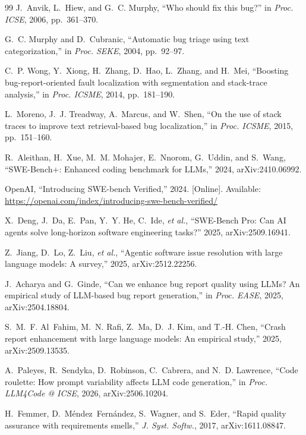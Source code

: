 \documentclass[journal]{IEEEtran}
\begin{document}
\begin{thebibliography}{99}
J.~Anvik, L.~Hiew, and G.~C. Murphy, ``Who should fix this bug?'' in \emph{Proc. ICSE}, 2006, pp.~361--370.

G.~C. Murphy and D.~Cubranic, ``Automatic bug triage using text categorization,'' in \emph{Proc. SEKE}, 2004, pp.~92--97.

C.~P. Wong, Y.~Xiong, H.~Zhang, D.~Hao, L.~Zhang, and H.~Mei, ``Boosting bug-report-oriented fault localization with segmentation and stack-trace analysis,'' in \emph{Proc. ICSME}, 2014, pp.~181--190.

L.~Moreno, J.~J. Treadway, A.~Marcus, and W.~Shen, ``On the use of stack traces to improve text retrieval-based bug localization,'' in \emph{Proc. ICSME}, 2015, pp.~151--160.

R.~Aleithan, H.~Xue, M.~M. Mohajer, E.~Nnorom, G.~Uddin, and S.~Wang, ``SWE-Bench+: Enhanced coding benchmark for LLMs,'' 2024, arXiv:2410.06992.

OpenAI, ``Introducing SWE-bench Verified,'' 2024. [Online]. Available: \url{https://openai.com/index/introducing-swe-bench-verified/}

X.~Deng, J.~Da, E.~Pan, Y.~Y. He, C.~Ide, \emph{et al.}, ``SWE-Bench Pro: Can AI agents solve long-horizon software engineering tasks?'' 2025, arXiv:2509.16941.

Z.~Jiang, D.~Lo, Z.~Liu, \emph{et al.}, ``Agentic software issue resolution with large language models: A survey,'' 2025, arXiv:2512.22256.

J.~Acharya and G.~Ginde, ``Can we enhance bug report quality using LLMs? An empirical study of LLM-based bug report generation,'' in \emph{Proc. EASE}, 2025, arXiv:2504.18804.

S.~M.~F. Al~Fahim, M.~N. Rafi, Z.~Ma, D.~J. Kim, and T.-H. Chen, ``Crash report enhancement with large language models: An empirical study,'' 2025, arXiv:2509.13535.

A.~Paleyes, R.~Sendyka, D.~Robinson, C.~Cabrera, and N.~D. Lawrence, ``Code roulette: How prompt variability affects LLM code generation,'' in \emph{Proc. LLM4Code @ ICSE}, 2026, arXiv:2506.10204.

H.~Femmer, D.~M{\'e}ndez~Fern{\'a}ndez, S.~Wagner, and S.~Eder, ``Rapid quality assurance with requirements smells,'' \emph{J. Syst. Softw.}, 2017, arXiv:1611.08847.


\end{thebibliography}
\end{document}
